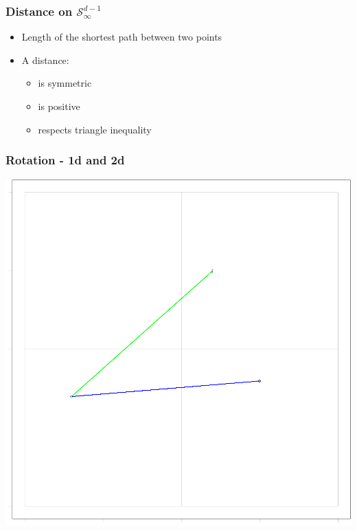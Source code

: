 \documentclass[aspectratio=169]{beamer}
\newlength{\frametextheight}
\begin{document}
\begin{frame}
  \frametitle{Distance on $\mathcal{S}_{\infty}^{d-1}$}
  \begin{itemize}
    \item Length of the shortest path between two points
    \pause
    \item A distance:
      \begin{itemize}
        \item is symmetric
        \item is positive
        \item respects triangle inequality
      \end{itemize}
  \end{itemize}
\end{frame}

\begin{frame}
    \frametitle{Rotation - 1d and 2d}
    \begin{center}
        \includegraphics[height = \frametextheight]{./images/rot_3d_2d}
    \end{center}
\end{frame}
\end{document}
